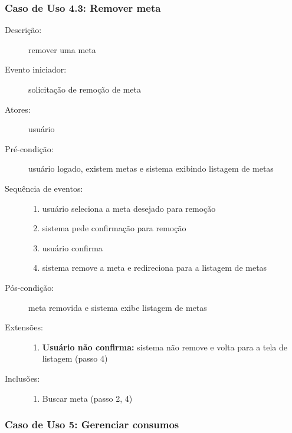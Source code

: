 \subsubsection{Caso de Uso 4.3: Remover meta}
\begin{description}
	\item[Descrição:] remover uma meta
	\item[Evento iniciador:] solicitação de remoção de meta
	\item[Atores:] usuário
	\item[Pré-condição:] usuário logado, existem metas e sistema exibindo listagem de metas
	\item[Sequência de eventos:] \hfill
		\begin{enumerate}
			\item{usuário seleciona a meta desejado para remoção}
			\item{sistema pede confirmação para remoção}
			\item{usuário confirma}
			\item{sistema remove a meta e redireciona para a listagem de metas}
		\end{enumerate}
	\item[Pós-condição:] meta removida e sistema exibe listagem de metas
	\item[Extensões:] \hfill
		\begin{enumerate}
			\item{\textbf{Usuário não confirma:} sistema não remove e volta para a tela de listagem (passo 4)}
		\end{enumerate}
	\item[Inclusões:] \hfill
		\begin{enumerate}
			\item{Buscar meta (passo 2, 4)}
		\end{enumerate}
\end{description}
\subsubsection{Caso de Uso 5: Gerenciar consumos}
